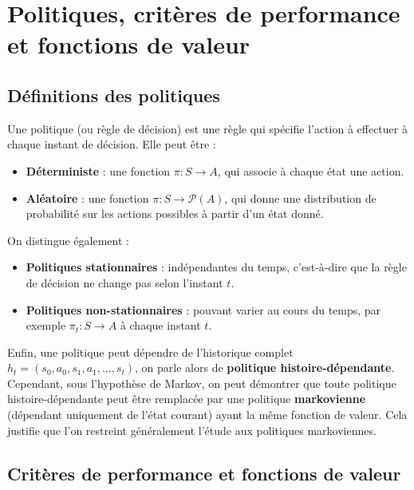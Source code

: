\documentclass[12pt]{article}
\begin{document}
\section{Politiques, critères de performance et fonctions de valeur}

\subsection{Définitions des politiques}

Une politique (ou règle de décision) est une règle qui spécifie l’action à effectuer à chaque instant de décision. Elle peut être :

\begin{itemize}
    \item \textbf{Déterministe} : une fonction \(\pi : S \to A\), qui associe à chaque état une action.
\vspace{0.5em}
    \item \textbf{Aléatoire} : une fonction \(\pi : S \to \mathcal{P}(A)\), qui donne une distribution de probabilité sur les actions possibles à partir d’un état donné.
\end{itemize}

On distingue également :

\begin{itemize}
    \item \textbf{Politiques stationnaires} : indépendantes du temps, c’est-à-dire que la règle de décision ne change pas selon l’instant \(t\).
\vspace{0.5em}
    \item \textbf{Politiques non-stationnaires} : pouvant varier au cours du temps, par exemple \(\pi_t : S \to A\) à chaque instant \(t\).
    
\end{itemize}

Enfin, une politique peut dépendre de l’historique complet \(h_t = (s_0, a_0, s_1, a_1, \dots, s_t)\), on parle alors de \textbf{politique histoire-dépendante}. Cependant, sous l’hypothèse de Markov, on peut démontrer que toute politique histoire-dépendante peut être remplacée par une politique \textbf{markovienne} (dépendant uniquement de l’état courant) ayant la même fonction de valeur. Cela justifie que l’on restreint généralement l’étude aux politiques markoviennes.

\subsection{Critères de performance et fonctions de valeur}
\end{document}
